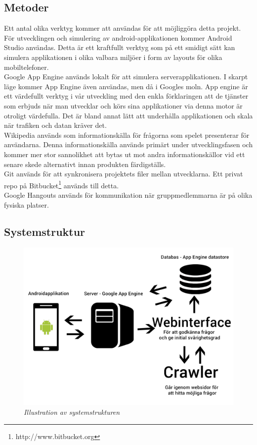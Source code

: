 \documentclass[12pt,a4paper]{article}
\begin{document}
\subsection{Metoder}
Ett antal olika verktyg kommer att användas för att möjliggöra detta projekt. För utvecklingen och simulering av android-applikationen kommer Android Studio användas. Detta är ett kraftfullt verktyg som på ett smidigt sätt kan simulera applikationen i olika valbara miljöer i form av layouts för olika mobiltelefoner. \cite{androidstudio}\\
Google App Engine används lokalt för att simulera serverapplikationen. I skarpt läge kommer App Engine även användas, men då i Googles moln. App engine är ett värdefullt verktyg i vår utveckling med den enkla förklaringen att de tjänster som erbjuds när man utvecklar och körs sina applikationer via denna motor är otroligt värdefulla. Det är bland annat lätt att underhålla applikationen och skala när trafiken och datan kräver det. \cite{googleappengine}\\
Wikipedia används som informationskälla för frågorna som spelet presenterar för användarna. Denna informationskälla används primärt under utvecklingsfasen och kommer mer stor sannolikhet att bytas ut mot andra informationskällor vid ett senare skede alternativt innan produkten färdigställs.\\
Git används för att synkronisera projektets filer mellan utvecklarna. Ett privat repo på Bitbucket\footnote{http://www.bitbucket.org} används till detta.\\
Google Hangouts används för kommunikation när gruppmedlemmarna är på olika fysiska platser.

\subsection{Systemstruktur}

\begin{figure}[H]
	\begin{centering}
	\includegraphics[scale=0.2]{systemstruktur.jpg} 
	\end{centering}
	\caption{\textit{Illustration av systemstrukturen}}
\end{figure} 
\end{document}
